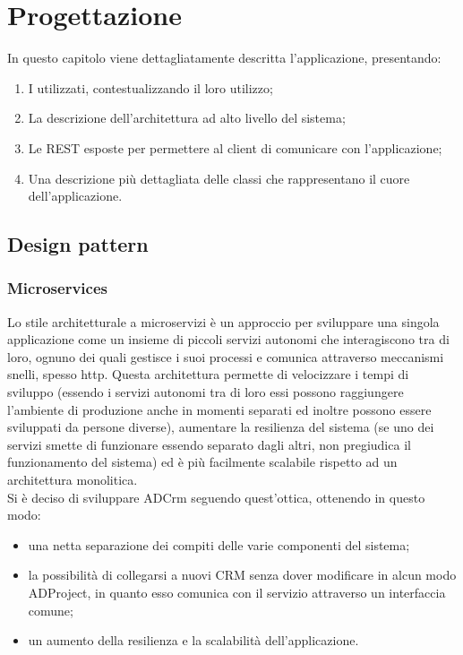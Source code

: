 \documentclass[12pt,a4paper,twoside,openany,english]{book}
\begin{document}
\chapter{Progettazione}\label{progettazione}
In questo capitolo viene dettagliatamente descritta l'applicazione, presentando: 
\begin{enumerate}
	\itemsep-0.5em
	\item I  utilizzati, contestualizzando il loro utilizzo;
	\item La descrizione dell'architettura ad alto livello del sistema;
	\item Le  REST esposte per permettere al client di comunicare con l'applicazione;
	\item Una descrizione più dettagliata delle classi che rappresentano il cuore dell'applicazione.
\end{enumerate}

\section{Design pattern}\label{design_pattern}
\subsection{Microservices}
Lo stile architetturale a microservizi è un approccio per sviluppare una singola applicazione come un insieme di piccoli servizi autonomi che interagiscono tra di loro, ognuno dei quali gestisce i suoi processi e comunica attraverso meccanismi snelli, spesso  \gls{http}.
Questa architettura permette di velocizzare i tempi di sviluppo (essendo i servizi autonomi tra di loro essi possono raggiungere l'ambiente di produzione anche in momenti separati ed inoltre possono essere sviluppati da persone diverse), aumentare la resilienza del sistema (se uno dei servizi smette di funzionare essendo separato dagli altri, non pregiudica il funzionamento del sistema) ed è più facilmente scalabile rispetto ad un architettura monolitica.\\
Si è deciso di sviluppare ADCrm seguendo quest'ottica, ottenendo in questo modo:
\begin{itemize}
	\itemsep-0.5em
	\item una netta separazione dei compiti delle varie componenti del sistema;
	\item la possibilità di collegarsi a nuovi \gls{CRM} senza dover modificare in alcun modo ADProject, in quanto esso comunica con il servizio attraverso un interfaccia comune;
	\item un aumento  della resilienza e la scalabilità dell'applicazione.
\end{itemize}
\end{document}
